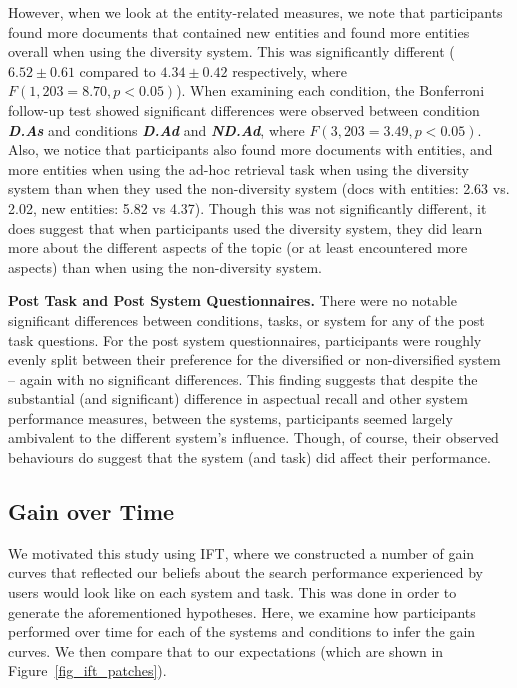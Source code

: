 However, when we look at the entity-related measures, we note that participants found more documents that contained new entities and found more entities overall when using the diversity system. This was significantly different ($6.52\pm0.61$ compared to $4.34\pm0.42$ respectively, where $F(1, 203=8.70, p<0.05)$). When examining each condition, the Bonferroni follow-up test showed significant differences were observed between condition \textbf{\emph{D.As}} and conditions \textbf{\emph{D.Ad}} and \textbf{\emph{ND.Ad}}, where $F(3, 203=3.49, p<0.05)$. Also, we notice that participants also found more documents with entities, and more entities when using the ad-hoc retrieval task when using the diversity system than when they used the non-diversity system (docs with entities: 2.63 vs. 2.02, new entities: 5.82 vs 4.37). Though this was not significantly different, it does suggest that when participants used the diversity system, they did learn more about the different aspects of the topic (or at least encountered more aspects) than when using the non-diversity system. 

\vspace{2mm}
\noindent\textbf{Post Task and Post System Questionnaires.} There were no notable significant differences between conditions, tasks, or system for any of the post task questions. For the post system questionnaires, participants were roughly evenly split between their preference for the diversified or non-diversified system -- again with no significant differences. This finding suggests that despite the substantial (and significant) difference in aspectual recall and other system performance measures, between the systems, participants seemed largely ambivalent to the different system's influence. Though, of course, their observed behaviours do suggest that the system (and task) did affect their performance.

\subsection{Gain over Time}
We motivated this study using IFT, where we constructed a number of gain curves that reflected our beliefs about the search performance experienced by users would look like on each system and task. This was done in order to generate the aforementioned hypotheses. Here, we examine how participants performed over time for each of the systems and conditions to infer the gain curves. We then compare that to our expectations (which are shown in Figure~\ref{fig_ift_patches}).


